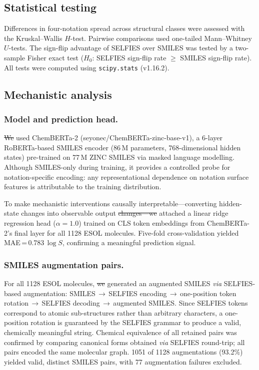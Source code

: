 \documentclass[twoside,twocolumn,9pt]{article}
\makeatletter
\newcommand{\logS}{\ensuremath{\log S}}
\providecommand{\DIFaddtex}[1]{{\protect\color{blue}\uwave{#1}}} %
\providecommand{\DIFdeltex}[1]{{\protect\color{red}\sout{#1}}} %
\providecommand{\DIFaddbegin}{} %
\providecommand{\DIFaddend}{} %
\providecommand{\DIFdelbegin}{} %
\providecommand{\DIFdelend}{} %
\providecommand{\DIFadd}[1]{\texorpdfstring{\DIFaddtex{#1}}{#1}} %
\providecommand{\DIFdel}[1]{\texorpdfstring{\DIFdeltex{#1}}{}} %
\providecommand{\DIFscaledelfig}{0.5}
\newlength{\DIFdelgraphicswidth} %
\newlength{\DIFdelgraphicsheight} %
\providecommand{\DIFaddincludegraphics}[2][]{{\color{blue}\fbox{\DIFOincludegraphics[#1]{#2}}}} %
\providecommand{\DIFdelincludegraphics}[2][]{%
\sbox{\DIFdelgraphicsbox}{\DIFOincludegraphics[#1]{#2}}%
\settoboxwidth{\DIFdelgraphicswidth}{\DIFdelgraphicsbox} %
\settoboxtotalheight{\DIFdelgraphicsheight}{\DIFdelgraphicsbox} %
\scalebox{\DIFscaledelfig}{%
\parbox[b]{\DIFdelgraphicswidth}{\usebox{\DIFdelgraphicsbox}\\[-\baselineskip] \rule{\DIFdelgraphicswidth}{0em}}\llap{\resizebox{\DIFdelgraphicswidth}{\DIFdelgraphicsheight}{%
\setlength{\unitlength}{\DIFdelgraphicswidth}%
\begin{picture}(1,1)%
\thicklines\linethickness{2pt} %
{\color[rgb]{1,0,0}\put(0,0){\framebox(1,1){}}}%
{\color[rgb]{1,0,0}\put(0,0){\line( 1,1){1}}}%
{\color[rgb]{1,0,0}\put(0,1){\line(1,-1){1}}}%
\end{picture}%
}\hspace*{3pt}}} %
} %
\DeclareRobustCommand{\DIFaddbegin}{\DIFOaddbegin \let\includegraphics\DIFaddincludegraphics} %
\DeclareRobustCommand{\DIFaddend}{\DIFOaddend \let\includegraphics\DIFOincludegraphics} %
\DeclareRobustCommand{\DIFdelbegin}{\DIFOdelbegin \let\includegraphics\DIFdelincludegraphics} %
\DeclareRobustCommand{\DIFdelend}{\DIFOaddend \let\includegraphics\DIFOincludegraphics} %
\let\sout@orig\sout %
\renewcommand{\sout}[1]{\ifmmode\text{\sout@orig{\ensuremath{#1}}}\else\sout@orig{#1}\fi} %
\makeatother
\begin{document}
\subsection{Statistical testing}

Differences in four-notation spread across structural classes were assessed with the Kruskal--Wallis $H$-test. Pairwise comparisons used one-tailed Mann--Whitney $U$-tests. The sign-flip advantage of SELFIES over SMILES was tested by a two-sample Fisher exact test ($H_0$: SELFIES sign-flip rate $\geq$ SMILES sign-flip rate). All tests were computed using \texttt{scipy.stats} (v1.16.2).

\subsection{Mechanistic analysis}

\subsubsection{Model and prediction head.~~} \DIFdelbegin \DIFdel{We }\DIFdelend \DIFaddbegin \DIFadd{I }\DIFaddend used ChemBERTa-2 (seyonec/ChemBERTa-zinc-base-v1),\cite{ahmad2022} a 6-layer RoBERTa-based SMILES encoder (86\,M parameters, 768-dimensional hidden states) pre-trained on 77\,M ZINC SMILES\cite{irwin2012} via masked language modelling. Although SMILES-only during training, it provides a controlled probe for notation-specific encoding: any representational dependence on notation surface features is attributable to the training distribution.

To make mechanistic interventions causally interpretable---converting hidden-state changes into observable output \DIFdelbegin \DIFdel{changes---we }\DIFdelend \DIFaddbegin \DIFadd{changes---I }\DIFaddend attached a linear ridge regression head ($\alpha=1.0$) trained on CLS token embeddings from ChemBERTa-2's final layer for all 1128 ESOL molecules. Five-fold cross-validation yielded MAE\,=\,0.783\,$\logS$, confirming a meaningful prediction signal.

\subsubsection{SMILES augmentation pairs.~~} For all 1128 ESOL molecules, \DIFdelbegin \DIFdel{we }\DIFdelend \DIFaddbegin \DIFadd{I }\DIFaddend generated an augmented SMILES \textit{via} SELFIES-based augmentation: SMILES\,$\to$\,SELFIES encoding\,$\to$\,one-position token rotation\,$\to$\,SELFIES decoding\,$\to$\,augmented SMILES. Since SELFIES tokens correspond to atomic sub-structures rather than arbitrary characters, a one-position rotation is guaranteed by the SELFIES grammar to produce a valid, chemically meaningful string. Chemical equivalence of all retained pairs was confirmed by comparing canonical forms obtained \textit{via} SELFIES round-trip; all pairs encoded the same molecular graph. 1051 of 1128 augmentations (93.2\%) yielded valid, distinct SMILES pairs, with 77 augmentation failures excluded.
\end{document}
